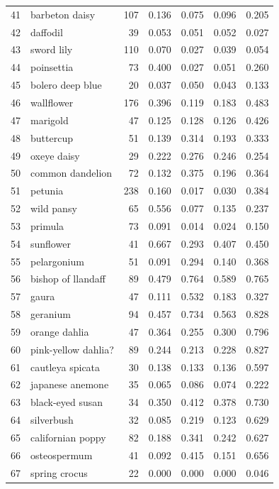 \begin{longtable}{r l r r r r r}
41 & barbeton daisy & 107 & 0.136 & 0.075 & 0.096 & 0.205 \\
42 & daffodil & 39 & 0.053 & 0.051 & 0.052 & 0.027 \\
43 & sword lily & 110 & 0.070 & 0.027 & 0.039 & 0.054 \\
44 & poinsettia & 73 & 0.400 & 0.027 & 0.051 & 0.260 \\
45 & bolero deep blue & 20 & 0.037 & 0.050 & 0.043 & 0.133 \\
46 & wallflower & 176 & 0.396 & 0.119 & 0.183 & 0.483 \\
47 & marigold & 47 & 0.125 & 0.128 & 0.126 & 0.426 \\
48 & buttercup & 51 & 0.139 & 0.314 & 0.193 & 0.333 \\
49 & oxeye daisy & 29 & 0.222 & 0.276 & 0.246 & 0.254 \\
50 & common dandelion & 72 & 0.132 & 0.375 & 0.196 & 0.364 \\
51 & petunia & 238 & 0.160 & 0.017 & 0.030 & 0.384 \\
52 & wild pansy & 65 & 0.556 & 0.077 & 0.135 & 0.237 \\
53 & primula & 73 & 0.091 & 0.014 & 0.024 & 0.150 \\
54 & sunflower & 41 & 0.667 & 0.293 & 0.407 & 0.450 \\
55 & pelargonium & 51 & 0.091 & 0.294 & 0.140 & 0.368 \\
56 & bishop of llandaff & 89 & 0.479 & 0.764 & 0.589 & 0.765 \\
57 & gaura & 47 & 0.111 & 0.532 & 0.183 & 0.327 \\
58 & geranium & 94 & 0.457 & 0.734 & 0.563 & 0.828 \\
59 & orange dahlia & 47 & 0.364 & 0.255 & 0.300 & 0.796 \\
60 & pink-yellow dahlia? & 89 & 0.244 & 0.213 & 0.228 & 0.827 \\
61 & cautleya spicata & 30 & 0.138 & 0.133 & 0.136 & 0.597 \\
62 & japanese anemone & 35 & 0.065 & 0.086 & 0.074 & 0.222 \\
63 & black-eyed susan & 34 & 0.350 & 0.412 & 0.378 & 0.730 \\
64 & silverbush & 32 & 0.085 & 0.219 & 0.123 & 0.629 \\
65 & californian poppy & 82 & 0.188 & 0.341 & 0.242 & 0.627 \\
66 & osteospermum & 41 & 0.092 & 0.415 & 0.151 & 0.656 \\
67 & spring crocus & 22 & 0.000 & 0.000 & 0.000 & 0.046 \\

\end{longtable}
